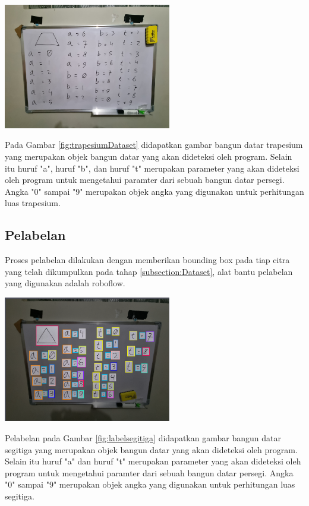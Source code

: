 \begin{center}
	\includegraphics[width=0.55\textwidth]{gambar/Trapesium Dataset.jpg}
	\label{fig:trapesiumDataset}
\end{center}
Pada Gambar \ref{fig:trapesiumDataset} didapatkan gambar bangun datar trapesium yang merupakan objek bangun datar yang akan dideteksi oleh program. Selain itu huruf "a", huruf "b", dan huruf "t" merupakan parameter yang akan dideteksi oleh program untuk mengetahui paramter dari sebuah bangun datar persegi. Angka "0" sampai "9" merupakan objek angka yang digunakan untuk perhitungan luas trapesium.


\subsection{Pelabelan}
\label{subsubsec: hasil label dataset}
Proses pelabelan dilakukan dengan memberikan bounding box pada tiap citra yang telah dikumpulkan pada tahap \ref{subsection:Dataset}, alat bantu pelabelan yang digunakan adalah roboflow.
\begin{center}
	\includegraphics[width=0.55\textwidth]{gambar/labeling.png}
	\label{fig:labelsegitiga}
\end{center}
Pelabelan pada Gambar \ref{fig:labelsegitiga} didapatkan gambar bangun datar segitiga yang merupakan objek bangun datar yang akan dideteksi oleh program. Selain itu huruf "a" dan huruf "t" merupakan parameter yang akan dideteksi oleh program untuk mengetahui paramter dari sebuah bangun datar persegi. Angka "0" sampai "9" merupakan objek angka yang digunakan untuk perhitungan luas segitiga.

